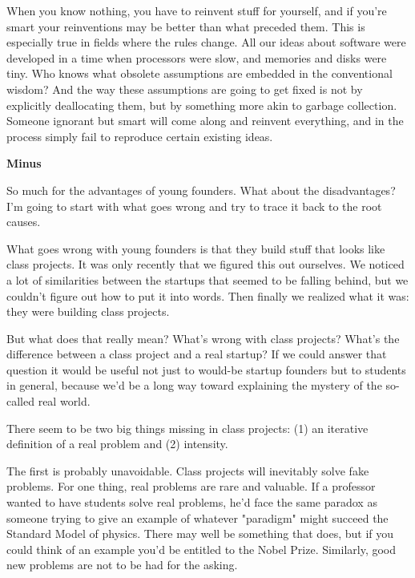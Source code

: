                   When you know nothing, you have to reinvent stuff for
                  yourself, and if you're smart your reinventions may be better
                  than what preceded them. This is especially true in fields
                  where the rules change. All our ideas about software were
                  developed in a time when processors were slow, and memories
                  and disks were tiny. Who knows what obsolete assumptions are
                  embedded in the conventional wisdom? And the way these
                  assumptions are going to get fixed is not by explicitly
                  deallocating them, but by something more akin to garbage
                  collection. Someone ignorant but smart will come along and
                  reinvent everything, and in the process simply fail to
                  reproduce certain existing ideas.

\textbf{Minus}

So much for the advantages of young founders.
                  What about the disadvantages? I'm going to start with what
                  goes wrong and try to trace it back to the root causes.

What
                  goes wrong with young founders is that they build stuff that
                  looks like class projects. It was only recently that we
                  figured this out ourselves. We noticed a lot of similarities
                  between the startups that seemed to be falling behind, but we
                  couldn't figure out how to put it into words. Then finally we
                  realized what it was: they were building class projects.

But
                  what does that really mean? What's wrong with class projects?
                  What's the difference between a class project and a real
                  startup? If we could answer that question it would be useful
                  not just to would-be startup founders but to students in
                  general, because we'd be a long way toward explaining the
                  mystery of the so-called real world.

There seem to
                  be two big things missing in class projects: (1) an iterative
                  definition of a real problem and (2) intensity.

The
                  first is probably unavoidable. Class projects will inevitably
                  solve fake problems. For one thing, real problems are rare and
                  valuable. If a professor wanted to have students solve real
                  problems, he'd face the same paradox as someone trying to give
                  an example of whatever "paradigm" might succeed the Standard
                  Model of physics. There may well be something that does, but
                  if you could think of an example you'd be entitled to the
                  Nobel Prize. Similarly, good new problems are not to be had
                  for the asking.

